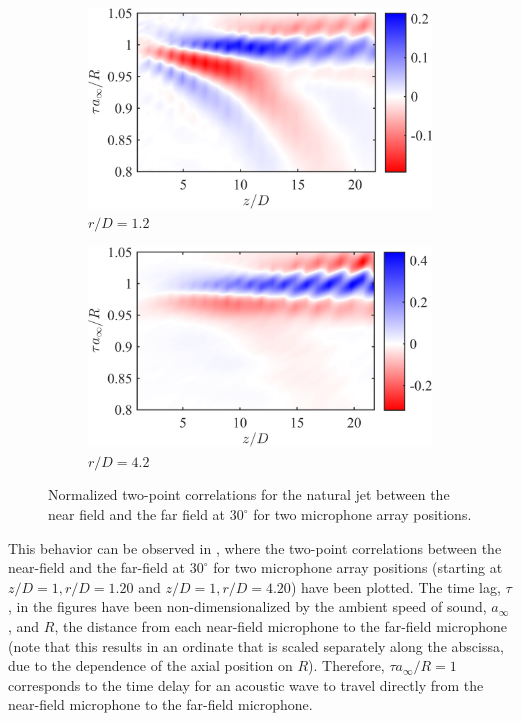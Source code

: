 \begin{figure}
	\centering
	\begin{subfigure}{.5\textwidth}
		\centering
		\includegraphics[width=0.95\linewidth]{Figures/ch3_St000_xcorr_r1D.png}
		\caption{$r/D = 1.2$}
		\label{fig:ch3_fullxcorr_r1D}
	\end{subfigure}%
	\begin{subfigure}{.5\textwidth}
		\centering
		\includegraphics[width=0.95\linewidth]{Figures/ch3_St000_xcorr_r4D.png}
		\caption{$r/D = 4.2$}
		\label{fig:ch3_fullxcorr_r4D}
	\end{subfigure}
	\caption{Normalized two-point correlations for the natural jet between the near field and the far field at $30^\circ$ for two microphone array positions.}
	\label{fig:ch3_fullxcorr}
\end{figure}

This behavior can be observed in , where the two-point correlations between the near-field and the far-field at $30^\circ$ for two microphone array positions (starting at $z/D = 1, r/D = 1.20$ and $z/D = 1, r/D = 4.20$) have been plotted.
The time lag, $\tau$, in the figures have been non-dimensionalized by the ambient speed of sound, $a_\infty$, and $R$, the distance from each near-field microphone to the far-field microphone (note that this results in an ordinate that is scaled separately along the abscissa, due to the dependence of the axial position on $R$).
Therefore, $\tau a_\infty /R = 1$ corresponds to the time delay for an acoustic wave to travel directly from the near-field microphone to the far-field microphone.

